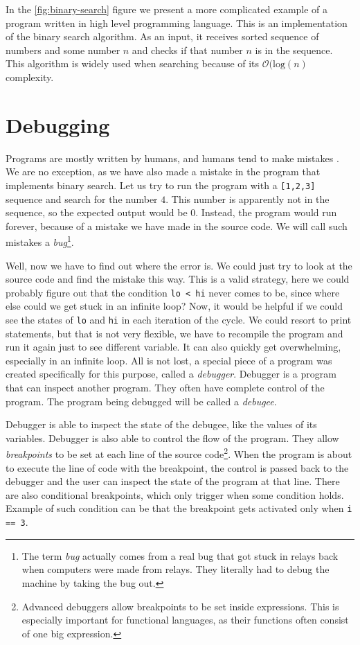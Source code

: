 In the \ref{fig:binary-search} figure we present a more complicated example of
a program written in high level programming language. This is an implementation
of the binary search algorithm. As an input, it receives sorted sequence of
numbers and some number $n$ and checks if that number $n$ is in the sequence.
This algorithm is widely used when searching because of its
$\mathcal{O}(\text{log}(n)$ complexity.

\section{Debugging}
Programs are mostly written by humans, and humans tend to make mistakes
\cite{human-error}. We are no exception, as we have also made a mistake in the
program that implements binary search. Let us try to run the program with a
\texttt{[1,2,3]} sequence and search for the number $4$. This number is
apparently not in the sequence, so the expected output would be $0$. Instead,
the program would run forever, because of a mistake we have made in the source
code. We will call such mistakes a \textit{bug}\footnote{The term \textit{bug}
actually comes from a real bug that got stuck in relays back when computers
were made from relays. They literally had to debug the machine by taking the
bug out.}.

Well, now we have to find out where the error is. We could just try to look at
the source code and find the mistake this way. This is a valid strategy, here
we could probably figure out that the condition \texttt{lo < hi} never comes to
be, since where else could we get stuck in an infinite loop? Now, it would be
helpful if we could see the states of \texttt{lo} and \texttt{hi} in each
iteration of the cycle. We could resort to print statements, but that is not
very flexible, we have to recompile the program and run it again just to see
different variable. It can also quickly get overwhelming, especially in an
infinite loop. All is not lost, a special piece of a program was created
specifically for this purpose, called a \textit{debugger}. Debugger is a
program that can inspect another program. They often have complete control of
the program. The program being debugged will be called a \textit{debugee}.

Debugger is able to inspect the state of the debugee, like the values of its
variables. Debugger is also able to control the flow of the program. They allow
\textit{breakpoints} to be set at each line of the source
code\footnote{Advanced debuggers allow breakpoints to be set inside
expressions. This is especially important for functional languages, as their
functions often consist of one big expression.}. When the program is about to
execute the line of code with the breakpoint, the control is passed back to the
debugger and the user can inspect the state of the program at that line. There
are also conditional breakpoints, which only trigger when some condition holds.
Example of such condition can be that the breakpoint gets activated only when
\texttt{i == 3}.

